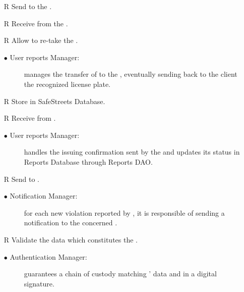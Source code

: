 \documentclass[../DD.tex]{subfiles}
\begin{document}
\begin{itemize}
	\item[R\subs{7}]Send  to the .
	\item[R\subs{8}]Receive  from the .
	\item[R\subs{26}]Allow  to re-take the .
	\begin{description}
	\item[$\bullet$ User reports Manager:] manages the transfer of  to the , eventually sending back to the client the recognized license plate.
	\end{description}

	\item[R\subs{12}]Store  in SafeStreets Database.
	\item[R\subs{25}]Receive  from .	
	\begin{description}
	\item[$\bullet$ User reports Manager:] handles the  issuing confirmation sent by the  and updates its status in Reports Database through Reports DAO.
	\end{description}

	\item[R\subs{11}]Send  to .
	\begin{description}
	\item[$\bullet$ Notification Manager:] for each new violation reported by , it is responsible of sending a notification to the concerned . 
	\end{description}

	\item[R\subs{15}]Validate the data which constitutes the .
	\begin{description}
	\item[$\bullet$ Authentication Manager:] guarantees a chain of custody matching ' data and  in a digital signature.
	\end{description}


\end{itemize}
\end{document}
